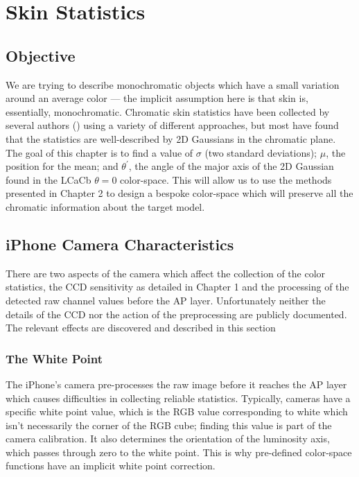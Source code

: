 
\chapter{Skin Statistics}\label{sec:ChapSkin}
\ifpdf
    \graphicspath{{Chapter3/Figs/Raster/}{Chapter3/Figs/PDF/}{Chapter3/Figs/}}
\else
    \graphicspath{{Chapter3/Figs/Vector/}{Chapter3/Figs/}}
\fi

\section{Objective}\label{sec:Objective}
We are trying to describe monochromatic objects which have a small variation around an average color --- the implicit assumption here is that skin is, essentially, monochromatic. Chromatic skin statistics have been collected by several authors (\cite{yang1998a,kollias1995,jedynak2003a,gomez2002a,Lee2002,Sigal2000a,Terrillon1999a}) using a variety of different approaches, but most have found that the statistics are well-described by 2D Gaussians in the chromatic plane. The goal of this chapter is to find a value of $\sigma$ (two standard deviations); $\mu$, the position for the mean; and $\theta^\prime$, the angle of the major axis of the 2D Gaussian found in the LCaCb $\theta = 0$ color-space. This will allow us to use the methods presented in Chapter 2 to design a bespoke color-space which will preserve all the chromatic information about the target model.

\section{iPhone Camera Characteristics} \label{sec:iPhoneCameraCharacteristics}
There are two aspects of the camera which affect the collection of the color statistics, the CCD sensitivity as detailed in Chapter 1 and the processing of the detected raw channel values before the AP layer. Unfortunately neither the details of the CCD nor the action of the preprocessing are publicly documented. The relevant effects are discovered and described in this section 

\subsection{The White Point}\label{sec:WhitePoint}
The iPhone's camera pre-processes the raw image before it reaches the AP layer which causes difficulties in collecting reliable statistics. Typically, cameras have a specific white point value, which is the RGB value corresponding to white which isn't necessarily the corner of the RGB cube; finding this value is part of the camera calibration. It also determines the orientation of the luminosity axis, which passes through zero to the white point. This is why pre-defined color-space functions have an implicit white point correction. 


